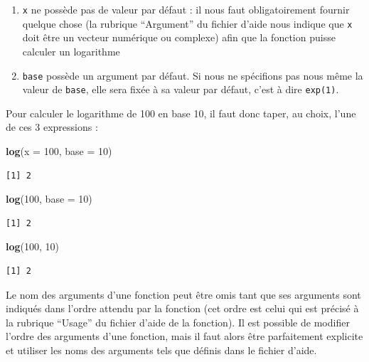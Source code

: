\documentclass[a4paperpaper,]{article}
\newenvironment{Shaded}{\begin{snugshade}}{\end{snugshade}}
\newcommand{\DataTypeTok}[1]{\textcolor[rgb]{0.00,0.34,0.68}{#1}}
\newcommand{\DecValTok}[1]{\textcolor[rgb]{0.69,0.50,0.00}{#1}}
\newcommand{\KeywordTok}[1]{\textcolor[rgb]{0.12,0.11,0.11}{\textbf{#1}}}
\newcommand{\NormalTok}[1]{\textcolor[rgb]{0.12,0.11,0.11}{#1}}
\providecommand{\tightlist}{%
  \setlength{\itemsep}{0pt}\setlength{\parskip}{0pt}}
\begin{document}
\begin{enumerate}
\def\labelenumi{\arabic{enumi}.}
\tightlist
\item
  \texttt{x} ne possède pas de valeur par défaut : il nous faut obligatoirement fournir quelque chose (la rubrique ``Argument'' du fichier d'aide nous indique que \texttt{x} doit être un vecteur numérique ou complexe) afin que la fonction puisse calculer un logarithme
\item
  \texttt{base} possède un argument par défaut. Si nous ne spécifions pas nous même la valeur de \texttt{base}, elle sera fixée à sa valeur par défaut, c'est à dire \texttt{exp(1)}.
\end{enumerate}

Pour calculer le logarithme de 100 en base 10, il faut donc taper, au choix, l'une de ces 3 expressions :

\begin{Shaded}
\begin{Highlighting}[]
\KeywordTok{log}\NormalTok{(}\DataTypeTok{x =} \DecValTok{100}\NormalTok{, }\DataTypeTok{base =} \DecValTok{10}\NormalTok{)}
\end{Highlighting}
\end{Shaded}

\begin{verbatim}
[1] 2
\end{verbatim}

\begin{Shaded}
\begin{Highlighting}[]
\KeywordTok{log}\NormalTok{(}\DecValTok{100}\NormalTok{, }\DataTypeTok{base =} \DecValTok{10}\NormalTok{)}
\end{Highlighting}
\end{Shaded}

\begin{verbatim}
[1] 2
\end{verbatim}

\begin{Shaded}
\begin{Highlighting}[]
\KeywordTok{log}\NormalTok{(}\DecValTok{100}\NormalTok{, }\DecValTok{10}\NormalTok{)}
\end{Highlighting}
\end{Shaded}

\begin{verbatim}
[1] 2
\end{verbatim}

Le nom des arguments d'une fonction peut être omis tant que ses arguments sont indiqués dans l'ordre attendu par la fonction (cet ordre est celui qui est précisé à la rubrique ``Usage'' du fichier d'aide de la fonction). Il est possible de modifier l'ordre des arguments d'une fonction, mais il faut alors être parfaitement explicite et utiliser les noms des arguments tels que définis dans le fichier d'aide.
\end{document}
